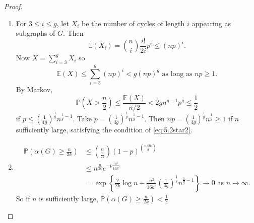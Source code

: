 \documentclass{article}
\begin{document}
\begin{proof}
    \begin{enumerate}
        \item For $3 \leq i \leq g$, let $X_i$ be the number of cycles of length $i$ appearing as subgraphs of $G$.
            Then
            \begin{equation*}
                \mathbb{E}(X_i) = \binom{n}{i} \frac{i!}{2i} p^i \leq (np)^i.
            \end{equation*}
            Now $X = \sum_{i=3}^g X_i$ so
            \begin{equation*}
                \mathbb{E}(X) \leq \sum_{i=3}^g (np)^i < g (np)^g \text{ as long as } np \geq 1. \label{eq:5.2star2}\tag{$*$}
            \end{equation*}
            By Markov,
            \begin{equation*}
                \mathbb{P}\left(X > \frac{n}{2}\right) \leq \frac{\mathbb{E}(X)}{n/2} < 2g n^{g-1} p^g \leq \frac{1}{2}
            \end{equation*}
            if $p \leq (\frac{1}{4g})^{\frac{1}{g}} n^{\frac{1}{g}-1}$.
            Take $p = (\frac{1}{4g})^{\frac{1}{g}} n^{\frac{1}{g}-1}$.
            Then $np = \left(\frac{1}{4g}\right)^\frac{1}{g} n^{\frac{1}{g}} \geq 1$ if $n$ sufficiently large, satisfying the condition of \eqref{eq:5.2star2}.
        \item \begin{align*}
                \mathbb{P}\left(\alpha(G) \geq \frac{n}{2k}\right) &\leq \binom{n}{\frac{n}{2k}} (1-p)^{\binom{n/2k}{2}} \\
                                                        &\leq n^{\frac{n}{2k}} e^{-p\frac{n^2}{16k^2}} \\
                                                        &= \exp\left\{\frac{2}{2k} \log n - \frac{n^2}{16k^2} \left(\frac{1}{4g}\right)^{\frac{1}{g}} n^{\frac{1}{g}-1}\right\} \to 0 \text{ as } n \to \infty.
            \end{align*}
            So if $n$ is sufficiently large, $\mathbb{P}(\alpha(G) \geq \frac{n}{2k}) < \frac{1}{2}$. \qedhere
    \end{enumerate}
\end{proof}
\end{document}
